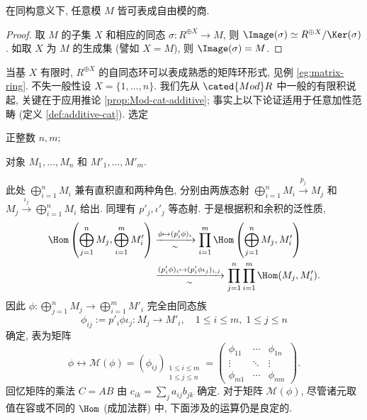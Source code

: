 \begin{corollary}
	在同构意义下, 任意模 $M$ 皆可表成自由模的商.
\end{corollary}
\begin{proof}
	取 $M$ 的子集 $X$ 和相应的同态 $\sigma: R^{\oplus X} \to M$, 则 $\Image(\sigma) \simeq R^{\oplus X}/\Ker(\sigma)$. 如取 $X$ 为 $M$ 的生成集 (譬如 $X=M$), 则 $\Image(\sigma)=M$.
\end{proof}

当基 $X$ 有限时, $R^{\oplus X}$ 的自同态环可以表成熟悉的矩阵环形式, 见例 \ref{eg:matrix-ring}. 不失一般性设 $X = \{1, \ldots, n\}$. 我们先从 $\cated{Mod}R$ 中一般的有限积说起, 关键在于应用推论 \ref{prop:Mod-cat-additive}; 事实上以下论证适用于任意加性范畴 (定义 \ref{def:additive-cat}). 选定
\begin{compactitem}
	\item 正整数 $n, m$;
	\item 对象 $M_1, \ldots, M_n$ 和 $M'_1, \ldots, M'_m$.
\end{compactitem}
此处 $\bigoplus_{i=1}^n M_i$ 兼有直积直和两种角色, 分别由两族态射 $\bigoplus_{i=1}^n M_i \xrightarrow{p_j} M_j$ 和 $M_j \xrightarrow{\iota_j} \bigoplus_{i=1}^n M_i$ 给出. 同理有 $p'_j, \iota'_j$ 等态射. 于是根据积和余积的泛性质,
\begin{align*}
	\Hom \left( \bigoplus_{j=1}^n M_j, \bigoplus_{i=1}^m M'_i \right) & \xrightarrow[\sim]{\phi \mapsto (p'_i \phi)_i } \prod_{i=1}^m \Hom\left(\bigoplus_{j=1}^n M_j , M'_i \right) \\
	& \xrightarrow[\sim]{(p'_i \phi)_i \mapsto (p'_i \phi \iota_j)_{i, j}} \prod_{j=1}^n \prod_{i=1}^m  \Hom(M_j, M'_i).
\end{align*}
因此 $\phi: \bigoplus_{j=1}^n M_j \to \bigoplus_{i=1}^m M'_i$ 完全由同态族
\[ \phi_{ij} := p'_i \phi \iota_j: M_j \to M'_i, \quad 1 \leq i \leq m, \; 1 \leq j \leq n \]
确定, 表为矩阵
\[ \phi \longleftrightarrow \mathcal{M}(\phi) = (\phi_{ij})_{\substack{1 \leq i \leq m \\ 1 \leq j \leq n}} = \begin{pmatrix}
	\phi_{11} & \cdots & \phi_{1n} \\
	\vdots & \ddots & \vdots \\
	\phi_{m1} & \cdots & \phi_{mn} 
\end{pmatrix}. \]
回忆矩阵的乘法 $C=AB$ 由 $c_{ik} = \sum_j a_{ij} b_{jk}$ 确定. 对于矩阵 $\mathcal{M}(\phi)$, 尽管诸元取值在容或不同的 $\Hom$ (成加法群) 中, 下面涉及的运算仍是良定的.

